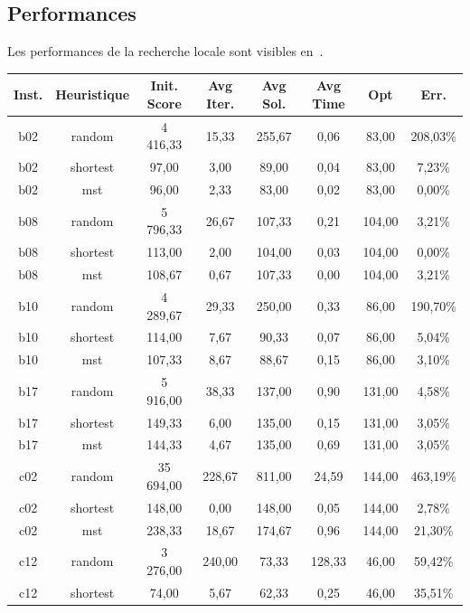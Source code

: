 \documentclass[10pt]{article}
\begin{document}
\subsection{Performances}

	Les performances de la recherche locale sont visibles en~.

	\begin{table}[h!]
		\centering
		\begin{tabular}{|c|c|c|c|c|c|c|c|}
		\hline
\textbf{Inst.} & \textbf{Heuristique} & \textbf{Init. \linebreak Score} & \textbf{Avg Iter.} & \textbf{Avg Sol.} & \textbf{Avg Time} & \textbf{Opt} & \textbf{Err.} \\
\hline
b02 & random & 4 416,33 & 15,33 & 255,67 & 0,06 & 83,00 & 208,03\% \\
b02 & shortest & 97,00 & 3,00 & 89,00 & 0,04 & 83,00 & 7,23\% \\
b02 & mst & 96,00 & 2,33 & 83,00 & 0,02 & 83,00 & 0,00\% \\
\hline
b08 & random & 5 796,33 & 26,67 & 107,33 & 0,21 & 104,00 & 3,21\% \\
b08 & shortest & 113,00 & 2,00 & 104,00 & 0,03 & 104,00 & 0,00\% \\
b08 & mst & 108,67 & 0,67 & 107,33 & 0,00 & 104,00 & 3,21\% \\
\hline
b10 & random & 4 289,67 & 29,33 & 250,00 & 0,33 & 86,00 & 190,70\% \\
b10 & shortest & 114,00 & 7,67 & 90,33 & 0,07 & 86,00 & 5,04\% \\
b10 & mst & 107,33 & 8,67 & 88,67 & 0,15 & 86,00 & 3,10\% \\
\hline
b17 & random & 5 916,00 & 38,33 & 137,00 & 0,90 & 131,00 & 4,58\% \\
b17 & shortest & 149,33 & 6,00 & 135,00 & 0,15 & 131,00 & 3,05\% \\
b17 & mst & 144,33 & 4,67 & 135,00 & 0,69 & 131,00 & 3,05\% \\
\hline
c02 & random & 35 694,00 & 228,67 & 811,00 & 24,59 & 144,00 & 463,19\% \\
c02 & shortest & 148,00 & 0,00 & 148,00 & 0,05 & 144,00 & 2,78\% \\
c02 & mst & 238,33 & 18,67 & 174,67 & 0,96 & 144,00 & 21,30\% \\
\hline
c12 & random & 3 276,00 & 240,00 & 73,33 & 128,33 & 46,00 & 59,42\% \\
c12 & shortest & 74,00 & 5,67 & 62,33 & 0,25 & 46,00 & 35,51\% \\

\end{tabular}
\end{table}
\end{document}
